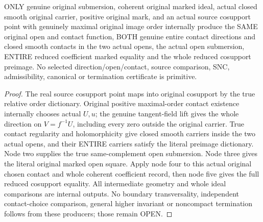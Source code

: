 \begin{theorem}
\label{hir:submersion-contact-restriction-original-only-consumer}
\leanok
ONLY genuine original submersion, coherent original marked ideal, actual
closed smooth original carrier, positive original mark, and an actual source
cosupport point with genuinely maximal original image order internally
produce the SAME original open and contact function, BOTH genuine entire
contact directions and closed smooth contacts in the two actual opens, the
actual open submersion, ENTIRE reduced coefficient marked equality and the
whole reduced cosupport preimage. No selected direction/open/contact,
source comparison, SNC, admissibility, canonical or termination certificate
is primitive.
\end{theorem}
\begin{proof}
The real source cosupport point maps into original cosupport by the true
relative order dictionary. Original positive maximal-order contact existence
internally chooses actual $U,u$; the genuine tangent-field lift gives the
whole direction on $V=f^{-1}U$, including every zero outside the original
carrier. True contact regularity and holomorphicity give closed smooth
carriers inside the two actual opens, and their ENTIRE carriers satisfy the
literal preimage dictionary. Node two supplies the true same-complement open
submersion. Node three gives the literal original marked open square. Apply
node four to this actual original chosen contact and whole coherent
coefficient record, then node five gives the full reduced cosupport equality.
All intermediate geometry and whole ideal comparisons are internal outputs.
No boundary transversality, independent contact-choice comparison, general
higher invariant or noncompact termination follows from these producers;
those remain OPEN.
\end{proof}
